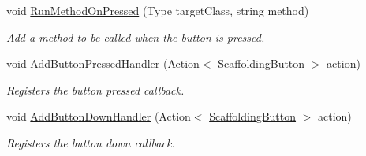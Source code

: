 \begin{DoxyCompactItemize}
void \hyperlink{class_scaffolding_1_1_scaffolding_button_a64d38c68237749eb7257c6bb29157af8}{Run\-Method\-On\-Pressed} (Type target\-Class, string method)
\begin{DoxyCompactList}\small\item\em Add a method to be called when the button is pressed. \end{DoxyCompactList}\item 
void \hyperlink{class_scaffolding_1_1_scaffolding_button_a14a7663cdb2337745c9da6eb49c27c84}{Add\-Button\-Pressed\-Handler} (Action$<$ \hyperlink{class_scaffolding_1_1_scaffolding_button}{Scaffolding\-Button} $>$ action)
\begin{DoxyCompactList}\small\item\em Registers the button pressed callback. \end{DoxyCompactList}\item 
void \hyperlink{class_scaffolding_1_1_scaffolding_button_a5857275c09f0c219bb7f5a5f2a345311}{Add\-Button\-Down\-Handler} (Action$<$ \hyperlink{class_scaffolding_1_1_scaffolding_button}{Scaffolding\-Button} $>$ action)
\begin{DoxyCompactList}\small\item\em Registers the button down callback. \end{DoxyCompactList}\end{DoxyCompactItemize}

